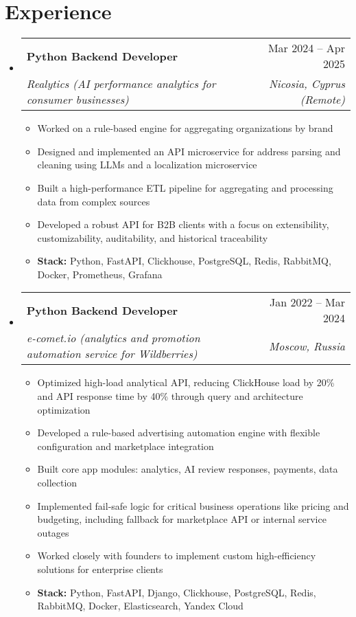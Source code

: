 \documentclass[letterpaper,11pt]{article}
\makeatletter
\newcommand{\resumeItem}[1]{
  \item\small{
    {#1 \vspace{-3pt}}
  }
}
\newcommand{\resumeSubheading}[4]{
  \vspace{-1pt}\item
    \begin{tabular*}{0.97\textwidth}[t]{l@{\extracolsep{\fill}}r}
      \textbf{#1} & #2 \\
      \textit{\small#3} & \textit{\small #4} \\
    \end{tabular*}\vspace{-8pt}
}
\newcommand{\resumeSubHeadingListStart}{\begin{itemize}[leftmargin=0.15in, label={}]}
\newcommand{\resumeSubHeadingListEnd}{\end{itemize}}
\newcommand{\resumeItemListStart}{\begin{itemize}}
\newcommand{\resumeItemListEnd}{\end{itemize}\vspace{-6pt}}
\makeatother
\begin{document}
\section{Experience}
  \resumeSubHeadingListStart
    \resumeSubheading
      {Python Backend Developer}{Mar 2024 -- Apr 2025}
      {Realytics (AI performance analytics for consumer businesses)}{Nicosia, Cyprus (Remote)}
      \resumeItemListStart
        \resumeItem{Worked on a rule-based engine for aggregating organizations by brand}
        \resumeItem{Designed and implemented an API microservice for address parsing and cleaning using LLMs and a localization microservice}
        \resumeItem{Built a high-performance ETL pipeline for aggregating and processing data from complex sources}
        \resumeItem{Developed a robust API for B2B clients with a focus on extensibility, customizability, auditability, and historical traceability}
      \resumeItemListEnd
      \small\vspace{-6pt}\begin{itemize}[leftmargin=0.15in, label={}]
    \item{\textbf{Stack:} Python, FastAPI, Clickhouse, PostgreSQL, Redis, RabbitMQ, Docker, Prometheus, Grafana}
    \end{itemize}
    \vspace{-8pt}
    \resumeSubheading
      {Python Backend Developer}{Jan 2022 -- Mar 2024}
      {e-comet.io (analytics and promotion automation service for Wildberries)}{Moscow, Russia}
      \resumeItemListStart
        \resumeItem{Optimized high-load analytical API, reducing ClickHouse load by 20\% and API response time by 40\% through query and architecture optimization}
        \resumeItem{Developed a rule-based advertising automation engine with flexible configuration and marketplace integration}
        \resumeItem{Built core app modules: analytics, AI review responses, payments, data collection}
        \resumeItem{Implemented fail-safe logic for critical business operations like pricing and budgeting, including fallback for marketplace API or internal service outages}
        \resumeItem{Worked closely with founders to implement custom high-efficiency solutions for enterprise clients}
      \resumeItemListEnd
      \small\vspace{-6pt}\begin{itemize}[leftmargin=0.15in, label={}]
        \item{\textbf{Stack:} Python, FastAPI, Django, Clickhouse, PostgreSQL, Redis, RabbitMQ, Docker, Elasticsearch, Yandex Cloud}
        \end{itemize}
  \resumeSubHeadingListEnd
\end{document}

